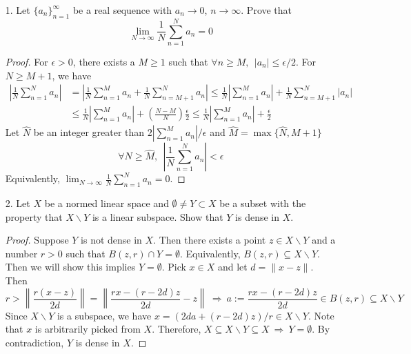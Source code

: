 
\begin{itemize}

	\item[1.] Let $\{a_n\}_{n=1}^\infty$ be a real sequence with $a_n \rightarrow 0$, $n \rightarrow \infty$. Prove that
	$$
	\lim_{N\rightarrow \infty} \frac{1}{N}\sum_{n=1}^Na_n = 0
	$$
 
	\begin{proof}
		For $\epsilon > 0$,  there exists a $M\ge 1$ such that $\forall n\ge M, ~~|a_n| \le \epsilon/2$. For $N\ge M+1$, we have 
		$$
		\begin{aligned}
		 \left\lvert\frac{1}{N}\sum_{n=1}^Na_n\right\rvert &=  \left\lvert\frac{1}{N}\sum_{n=1}^Ma_n + \frac{1}{N} \sum_{n=M+1}^Na_n\right\rvert \le \frac{1}{N}\left\lvert\sum_{n=1}^Ma_n \right\rvert + \frac{1}{N} \sum_{n=M+1}^N\left\lvert a_n\right\rvert  \\
		 &\le \frac{1}{N}\left\lvert\sum_{n=1}^Ma_n \right\rvert + \left(\frac{N-M}{N}\right)\frac{\epsilon}{2}\le \frac{1}{N}\left\lvert\sum_{n=1}^Ma_n \right\rvert + \frac{\epsilon}{2}
		\end{aligned}
		$$
		Let $\widehat{N}$ be an integer greater than $2\left\lvert\sum_{n=1}^Ma_n \right\rvert/\epsilon$ and $\widehat{M} = \max\{\widehat{N}, M+1\}$
		$$
		\forall N \ge \widehat{M}, ~~\left\lvert\frac{1}{N}\sum_{n=1}^Na_n\right\rvert < \epsilon
		$$
		Equivalently, $\lim_{N\rightarrow \infty} \frac{1}{N}\sum_{n=1}^Na_n = 0$.
	\end{proof}

	\item[2.] Let $X$ be a normed linear space and $\emptyset \neq Y\subset X$ be  a subset with the property that
	$X \backslash Y$ is a linear subspace. Show that $Y$ is dense in $X$.

	\begin{proof}
		 Suppose $Y$ is not dense in $X$. Then there exists a point $z\in X\backslash Y$ and a number $r > 0$ such that 
		 $B(z, r) \cap Y=\emptyset$. Equivalently, $B(z,r)\subseteq X\backslash Y$. Then we will show this implies $Y=\emptyset$. Pick $x\in X$ and let $d= \lVert x-z\rVert$. Then
		 $$
		 r>\left\lVert \frac{r(x-z)}{2d}  \right\rVert = \left\lVert \frac{rx- (r-2d)z}{2d} - z \right\rVert ~\Rightarrow~ a:=\frac{rx- (r-2d)z}{2d}\in B(z,r) \subseteq X\backslash Y
		 $$  
		 Since $X\backslash Y$ is a subspace, we have $x = (2da+(r-2d)z)/r \in X\backslash Y$. Note that $x$ is arbitrarily picked from $X$. Therefore, $X\subseteq X\backslash Y \subseteq X ~\Rightarrow~ Y = \emptyset$. By contradiction, $Y$ is dense in $X$.
	\end{proof}
	

\end{itemize}
